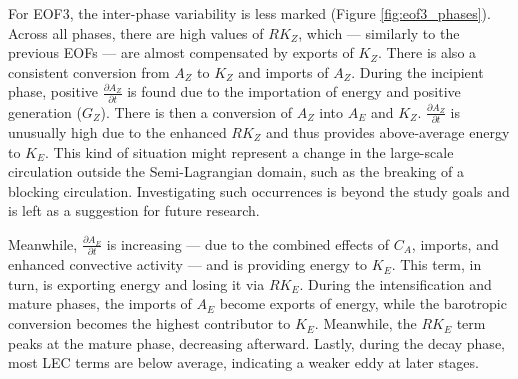For EOF3, the inter-phase variability is less marked (Figure \ref{fig:eof3_phases}). Across all phases, there are high values of $RK_Z$, which — similarly to the previous EOFs — are almost compensated by exports of $K_Z$. There is also a consistent conversion from $A_Z$ to $K_Z$ and imports of $A_Z$. During the incipient phase, positive $\frac{\partial A_Z}{\partial t}$ is found due to the importation of energy and positive generation ($G_Z$). There is then a conversion of $A_Z$ into $A_E$ and $K_Z$. $\frac{\partial A_Z}{\partial t}$ is unusually high due to the enhanced $RK_Z$ and thus provides above-average energy to $K_E$. This kind of situation might represent a change in the large-scale circulation outside the Semi-Lagrangian domain, such as the breaking of a blocking circulation. Investigating such occurrences is beyond the study goals and is left as a suggestion for future research.


Meanwhile, $\frac{\partial A_E}{\partial t}$ is increasing — due to the combined effects of $C_A$, imports, and enhanced convective activity — and is providing energy to $K_E$. This term, in turn, is exporting energy and losing it via $RK_E$. During the intensification and mature phases, the imports of $A_E$ become exports of energy, while the barotropic conversion becomes the highest contributor to $K_E$. Meanwhile, the $RK_E$ term peaks at the mature phase, decreasing afterward. Lastly, during the decay phase, most LEC terms are below average, indicating a weaker eddy at later stages.

